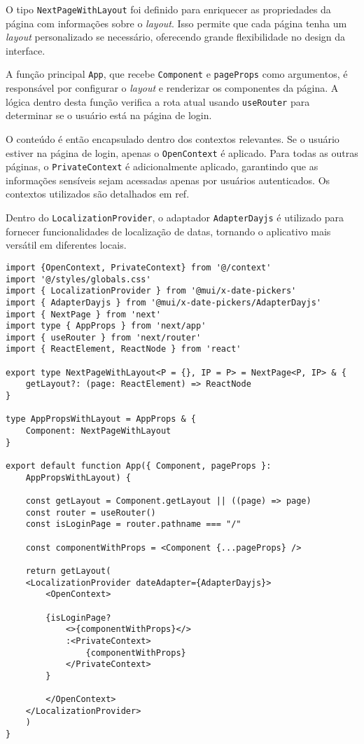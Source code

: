 O tipo \texttt{NextPageWithLayout} foi definido para enriquecer as propriedades da página com informações sobre o \textit{layout}. Isso permite que cada página tenha um \textit{layout} personalizado se necessário, oferecendo grande flexibilidade no design da interface.

A função principal \texttt{App}, que recebe \texttt{Component} e \texttt{pageProps} como argumentos, é responsável por configurar o \textit{layout} e renderizar os componentes da página. A lógica dentro desta função verifica a rota atual usando \texttt{useRouter} para determinar se o usuário está na página de login.

O conteúdo é então encapsulado dentro dos contextos relevantes. Se o usuário estiver na página de login, apenas o \texttt{OpenContext} é aplicado. Para todas as outras páginas, o \texttt{PrivateContext} é adicionalmente aplicado, garantindo que as informações sensíveis sejam acessadas apenas por usuários autenticados. Os contextos utilizados são detalhados em ref. %

Dentro do \texttt{LocalizationProvider}, o adaptador \texttt{AdapterDayjs} é utilizado para fornecer funcionalidades de localização de datas, tornando o aplicativo mais versátil em diferentes locais.


\begin{verbatim}
import {OpenContext, PrivateContext} from '@/context'
import '@/styles/globals.css'
import { LocalizationProvider } from '@mui/x-date-pickers'
import { AdapterDayjs } from '@mui/x-date-pickers/AdapterDayjs'
import { NextPage } from 'next'
import type { AppProps } from 'next/app'
import { useRouter } from 'next/router'
import { ReactElement, ReactNode } from 'react'

export type NextPageWithLayout<P = {}, IP = P> = NextPage<P, IP> & {
    getLayout?: (page: ReactElement) => ReactNode
}

type AppPropsWithLayout = AppProps & {
    Component: NextPageWithLayout
}

export default function App({ Component, pageProps }: 
    AppPropsWithLayout) {

    const getLayout = Component.getLayout || ((page) => page)
    const router = useRouter()
    const isLoginPage = router.pathname === "/"

    const componentWithProps = <Component {...pageProps} /> 

    return getLayout(
    <LocalizationProvider dateAdapter={AdapterDayjs}>
        <OpenContext>

        {isLoginPage?
            <>{componentWithProps}</>
            :<PrivateContext>
                {componentWithProps}
            </PrivateContext>
        }

        </OpenContext>  
    </LocalizationProvider>
    )
}
\end{verbatim}

